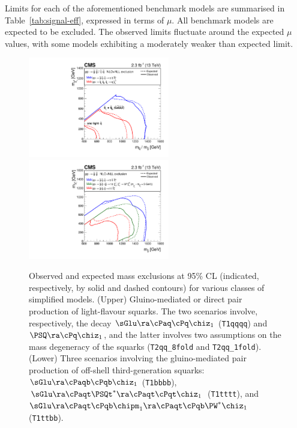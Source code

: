 Limits for each of the aforementioned benchmark models are summarised
in Table~\ref{tab:signal-eff}, expressed in terms of $\mu$. All
benchmark models are expected to be excluded. The observed limits
fluctuate around the expected $\mu$ values, with some models
exhibiting a moderately weaker than expected limit.

\begin{figure}[h!]
  \begin{center}
    \includegraphics[width=0.55\textwidth]{figures/limits/v4/mixSUMMARY.pdf}
    \includegraphics[width=0.55\textwidth]{figures/limits/v4/gluinoSUMMARY.pdf} 
    \caption{Observed and expected mass exclusions at 95\% CL
      (indicated, respectively, by solid and dashed contours) for
      various classes of simplified models. (Upper) Gluino-mediated or
      direct pair production of light-flavour squarks. The two
      scenarios involve, respectively, the decay
      $\sGlu\ra\cPaq\cPq\chiz_1$ (\texttt{T1qqqq}) and
      $\PSQ\ra\cPq\chiz_1$, and the latter involves two assumptions on
      the mass degeneracy of the squarks (\texttt{T2qq\_8fold} and
      \texttt{T2qq\_1fold}). (Lower) Three scenarios involving the
      gluino-mediated pair production of off-shell third-generation
      squarks: $\sGlu\ra\cPaqb\cPqb\chiz_1$ (\texttt{T1bbbb}),
      $\sGlu\ra\cPaqt\PSQt^*\ra\cPaqt\cPqt\chiz_1$ (\texttt{T1tttt}),
      and $\sGlu\ra\cPaqt\cPqb\chipm_1\ra\cPaqt\cPqb\PW^*\chiz_1$
      (\texttt{T1ttbb}).  }
    \label{fig:limits-sms-1} 
    \vspace{2.0cm} %
  \end{center}
\end{figure}

